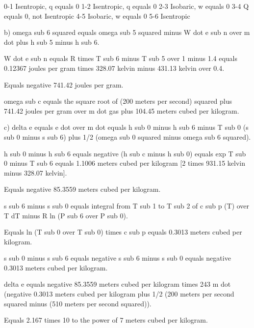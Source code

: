 0-1 Isentropic, q equals 0  
1-2 Isentropic, q equals 0  
2-3 Isobaric, w equals 0  
3-4 Q equals 0, not Isentropic  
4-5 Isobaric, w equals 0  
5-6 Isentropic

b) omega sub 6 squared equals omega sub 5 squared minus W dot e sub n over m dot plus h sub 5 minus h sub 6.

W dot e sub n equals R times T sub 6 minus T sub 5 over 1 minus 1.4 equals 0.12367 joules per gram times 328.07 kelvin minus 431.13 kelvin over 0.4.

Equals negative 741.42 joules per gram.

omega sub c equals the square root of (200 meters per second) squared plus 741.42 joules per gram over m dot gas plus 104.45 meters cubed per kilogram.

c) delta e equals e dot over m dot equals h sub 0 minus h sub 6 minus T sub 0 (s sub 0 minus s sub 6) plus 1/2 (omega sub 0 squared minus omega sub 6 squared).

h sub 0 minus h sub 6 equals negative (h sub c minus h sub 0) equals exp T sub 0 minus T sub 6 equals 1.1006 meters cubed per kilogram [2 times 931.15 kelvin minus 328.07 kelvin].

Equals negative 85.3559 meters cubed per kilogram.

s sub 6 minus s sub 0 equals integral from T sub 1 to T sub 2 of c sub p (T) over T dT minus R ln (P sub 6 over P sub 0).

Equals ln (T sub 0 over T sub 0) times c sub p equals 0.3013 meters cubed per kilogram.

s sub 0 minus s sub 6 equals negative s sub 6 minus s sub 0 equals negative 0.3013 meters cubed per kilogram.

delta e equals negative 85.3559 meters cubed per kilogram times 243 m dot (negative 0.3013 meters cubed per kilogram plus 1/2 (200 meters per second squared minus (510 meters per second squared)).

Equals 2.167 times 10 to the power of 7 meters cubed per kilogram.